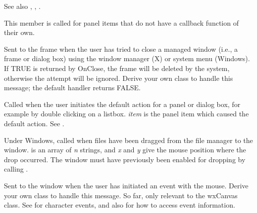 See also , ,\rtfsp
{}.

\label{wxevthandleroncommand}


This member is called for panel items that do not have a callback function
of their own.

\label{wxevthandleronclose}

Sent to the frame when the user has tried to close a managed window (i.e., a frame
or dialog box) using the window manager (X) or system menu (Windows).  If TRUE is returned by
OnClose, the frame will be deleted by the system, otherwise the
attempt will be ignored. Derive your own class to handle this message;
the default handler returns FALSE.


\label{wxevthandlerondefaultaction}


Called when the user initiates the default action for a panel or
dialog box, for example by double clicking on a listbox. {\it item}
is the panel item which caused the default action.
See .



Under Windows, called when files have been dragged from the file manager to the window.
 is an array of {\it n} strings, and {\it x} and {\it y} give the mouse position
where the drop occurred. The window must have previously been enabled for dropping by calling
\rtfsp{}.

\label{wxevthandleronevent}


Sent to the window when the user has initiated an event with the
mouse. Derive your own class to handle this message. So far,
only relevant to the wxCanvas class. See  for character
events, and also  for how to access event information.

